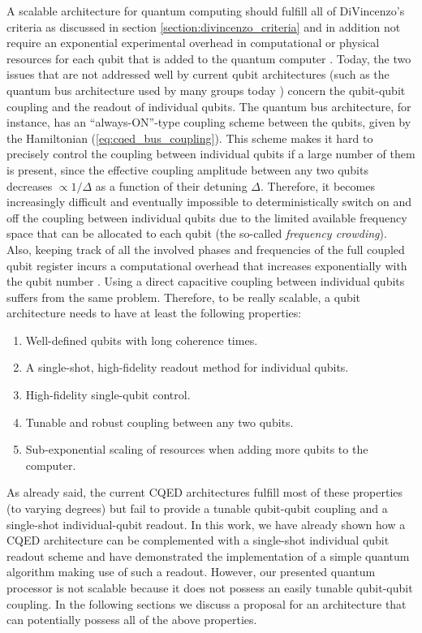 A scalable architecture for quantum computing should fulfill all of DiVincenzo's criteria as discussed in section \ref{section:divincenzo_criteria} and in addition not require an exponential experimental overhead in computational or physical resources for each qubit that is added to the quantum computer \citep{blume-kohout_climbing_2002}. Today, the two issues that are not addressed well by current qubit architectures (such as the quantum bus architecture used by many groups today \citep{dicarlo_demonstration_2009,wallraff_strong_2004}) concern the qubit-qubit coupling and the readout of individual qubits. The quantum bus architecture, for instance, has an ``always-ON''-type coupling scheme between the qubits, given by the Hamiltonian (\ref{eq:cqed_bus_coupling}). This scheme makes it hard to precisely control the coupling between individual qubits if a large number of them is present, since the effective coupling amplitude between any two qubits decreases $\propto 1/\Delta$ as a function of their detuning $\Delta$. Therefore, it becomes increasingly difficult and eventually impossible to deterministically switch on and off the coupling between individual qubits due to the limited available frequency space that can be allocated to each qubit (the so-called {\it frequency crowding}). Also, keeping track of all the involved phases and frequencies of the full coupled qubit register incurs a computational overhead that increases exponentially with the qubit number \citep{galiautdinov_resonatorzero-qubit_2012}. Using a direct capacitive coupling between individual qubits suffers from the same problem. Therefore, to be really scalable, a qubit architecture needs to have at least the following properties:

\begin{enumerate}
\item Well-defined qubits with long coherence times.
\item A single-shot, high-fidelity readout method for individual qubits.
\item High-fidelity single-qubit control.
\item Tunable and robust coupling between any two qubits.
\item Sub-exponential scaling of resources when adding more qubits to the computer.
\end{enumerate}

As already said, the current CQED architectures fulfill most of these properties (to varying degrees) but fail to provide a tunable qubit-qubit coupling and a single-shot individual-qubit readout. In this work, we have already shown how a CQED architecture can be complemented with a single-shot individual qubit readout scheme and have demonstrated the implementation of a simple quantum algorithm making use of such a readout. However, our presented quantum processor is not scalable because it does not possess an easily tunable qubit-qubit coupling. In the following sections we discuss a proposal for an architecture that can potentially possess all of the above properties.

